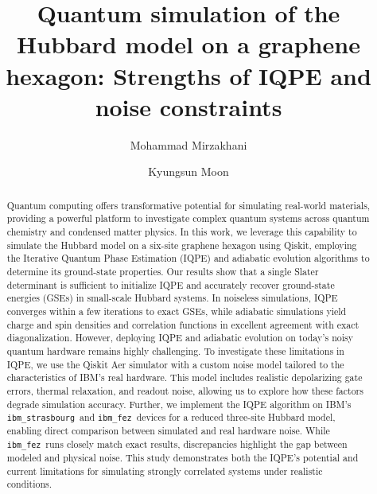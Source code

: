 \documentclass[twocolumn,superscriptaddress,amsmath,amssymb,showpacs,floatfix,preprintnumbers]{revtex4-1}
\newcommand{\ibmstr}{\texttt{ibm\_strasbourg}}
\newcommand{\ibmfez}{\texttt{ibm\_fez}}
\begin{document}
\title{Quantum simulation of the Hubbard model on a graphene hexagon: 
	Strengths of IQPE and noise constraints}

\author{Mohammad Mirzakhani}

\author{Kyungsun Moon}

\begin{abstract}
Quantum computing offers transformative potential for simulating real-world materials, providing 
a powerful platform to investigate complex quantum systems across quantum chemistry and 
condensed matter physics.
%
In this work, we leverage this capability to simulate the Hubbard model on a six-site graphene
hexagon using Qiskit, employing the Iterative Quantum Phase Estimation (IQPE) and adiabatic 
evolution algorithms to determine its ground-state properties. 
%
Our results show that a single Slater determinant is sufficient to initialize IQPE and accurately recover ground-state energies (GSEs) in small-scale Hubbard systems. 
%
In noiseless simulations, IQPE converges within a few iterations to exact GSEs, while adiabatic simulations yield charge and spin densities and correlation functions in excellent agreement with exact diagonalization.
%
However, deploying IQPE and adiabatic evolution on today's noisy quantum hardware remains highly
challenging. 
%
To investigate these limitations in IQPE, we use the Qiskit Aer simulator with a custom noise model 
tailored to the characteristics of IBM's real hardware. 
%
This model includes realistic depolarizing gate errors, thermal relaxation, and readout noise,
allowing us to explore how these factors degrade simulation accuracy. 
%
Further, we implement the IQPE algorithm on IBM's \ibmstr\ and \ibmfez\ devices for a reduced three-site Hubbard model, enabling direct comparison between simulated and real hardware noise. 
%
While \ibmfez\ runs closely match exact results, discrepancies highlight the gap between modeled and physical noise. 
%
This study demonstrates both the IQPE's potential and current limitations for simulating strongly correlated systems under realistic conditions.
\end{abstract}

\maketitle
\end{document}
